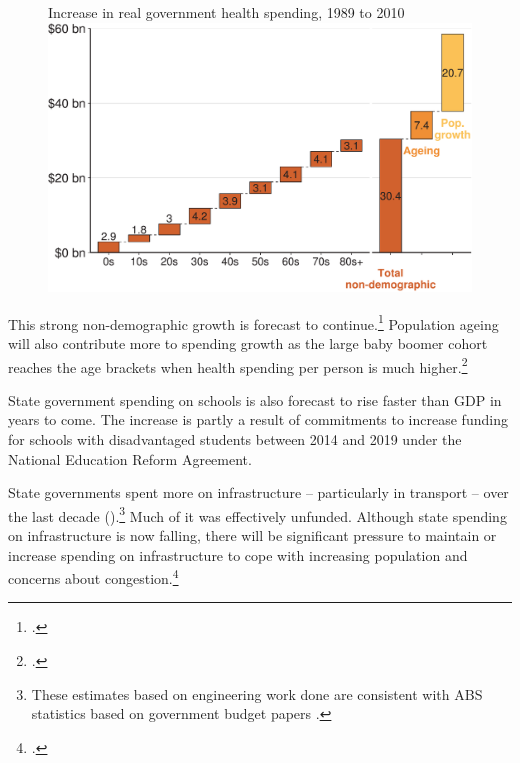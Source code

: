 \begin{figure}
%
{Increase in real government health spending, 1989 to 2010}
\includegraphics[width=\columnwidth]{Fiscal-challenges/figure/Figure13-1.pdf}

\end{figure}

This strong non-demographic growth is forecast to continue.\footcite{ProductivityCommission2013AgeingAustralia}  Population ageing will also contribute more to spending growth as the large baby boomer cohort reaches the age brackets when health spending per person is much higher.\footcite[][26]{DaleyWoodWeidmannEtAl2014}  

State government spending on schools is also forecast to rise faster than GDP in years to come. The increase is partly a result of commitments to increase funding for schools with disadvantaged students between 2014 and 2019 under the National Education Reform Agreement.  

State governments spent more on infrastructure – particularly in transport – over the last decade ().\footnote{These estimates based on engineering work done are consistent with ABS statistics based on government budget papers \textcite[][41]{PBO2015a}.}  Much of it was effectively unfunded. Although state spending on infrastructure is now falling, there will be significant pressure to maintain or increase spending on infrastructure to cope with increasing population and concerns about congestion.\footcites[][112-128]{KellyDonegan2015}{InfrastructureAustralia2015-InfrastructureAudit}

